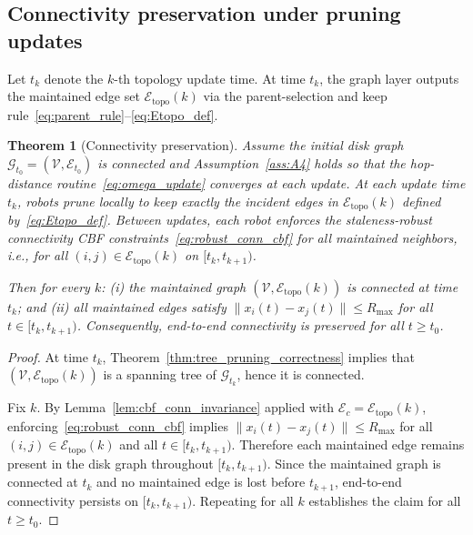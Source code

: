 \documentclass[conference]{IEEEconf}
\theoremstyle{plain}
\newtheorem{theorem}{Theorem}
\begin{document}
\subsection{Connectivity preservation under pruning updates}
\label{subsec:hybrid_connectivity}

Let $t_k$ denote the $k$-th topology update time. At time $t_k$, the graph layer outputs the maintained edge set $\mathcal{E}_{\mathrm{topo}}(k)$ via the parent-selection and keep rule~\eqref{eq:parent_rule}--\eqref{eq:Etopo_def}.

\begin{theorem}[Connectivity preservation]
\label{thm:hybrid_connectivity}
Assume the initial disk graph $\mathcal{G}_{t_0}=(\mathcal{V},\mathcal{E}_{t_0})$ is connected and Assumption~\ref{ass:A4} holds so that the hop-distance routine~\eqref{eq:omega_update} converges at each update.
At each update time $t_k$, robots prune locally to keep exactly the incident edges in $\mathcal{E}_{\mathrm{topo}}(k)$ defined by~\eqref{eq:Etopo_def}.
Between updates, each robot enforces the staleness-robust connectivity CBF constraints~\eqref{eq:robust_conn_cbf} for all maintained neighbors, i.e., for all $(i,j)\in\mathcal{E}_{\mathrm{topo}}(k)$ on $[t_k,t_{k+1})$.

Then for every $k$:
(i) the maintained graph $(\mathcal{V},\mathcal{E}_{\mathrm{topo}}(k))$ is connected at time $t_k$; and
(ii) all maintained edges satisfy $\|x_i(t)-x_j(t)\|\le R_{\max}$ for all $t\in[t_k,t_{k+1})$.
Consequently, end-to-end connectivity is preserved for all $t\ge t_0$.
\end{theorem}

\begin{proof}
At time $t_k$, Theorem~\ref{thm:tree_pruning_correctness} implies that $(\mathcal{V},\mathcal{E}_{\mathrm{topo}}(k))$ is a spanning tree of $\mathcal{G}_{t_k}$, hence it is connected.

Fix $k$. By Lemma~\ref{lem:cbf_conn_invariance} applied with $\mathcal{E}_c=\mathcal{E}_{\mathrm{topo}}(k)$, enforcing~\eqref{eq:robust_conn_cbf} implies
$\|x_i(t)-x_j(t)\|\le R_{\max}$ for all $(i,j)\in\mathcal{E}_{\mathrm{topo}}(k)$ and all $t\in[t_k,t_{k+1})$.
Therefore each maintained edge remains present in the disk graph throughout $[t_k,t_{k+1})$.
Since the maintained graph is connected at $t_k$ and no maintained edge is lost before $t_{k+1}$, end-to-end connectivity persists on $[t_k,t_{k+1})$.
Repeating for all $k$ establishes the claim for all $t\ge t_0$.
\end{proof}
\end{document}
